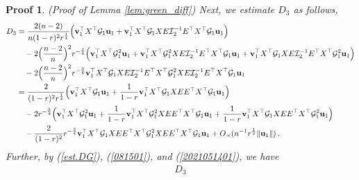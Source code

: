 \documentclass[12pt]{article}
\numberwithin{equation}{section}
\newtheorem{myPro}{Proof}
\theoremstyle{remark}
\newcommand{\1}{{\rm 1}\kern-0.24em{\rm I}}
\begin{document}
\begin{appendices}
\begin{myPro}{(Proof of Lemma \ref{lem:green_diff})}
Next, we estimate $D_3$ as follows,
\begin{align*}
D_3&=\frac{2(n-2)}{n(1-r)^2r^{\frac 14}} \Big( {\bf v}_1^{\top} {X}^{\top} \mathcal{G}_1{\bf u}_1 + {\bf v}_1^{\top} {X}^{\top} \mathcal{G}_1{X}{E} \mathcal{I}_2^{-1}{E}^{\top} {X}^{\top} \mathcal{G}_1 {\bf u}_1\Big) \notag\\
&\quad -2\Big(\frac{n-2}{n}\Big)^2  r^{-\frac 34}\Big( {\bf v}_1^{\top} {X}^{\top} \mathcal{G}_1^2{\bf u}_1 + {\bf v}_1^{\top} {X}^{\top} \mathcal{G}_1^2{X}{E} \mathcal{I}_2^{-1}{E}^{\top} {X}^{\top} \mathcal{G}_1{\bf u}_1 + {\bf v}_1^{\top} {X}^{\top} \mathcal{G}_1{X}{E} \mathcal{I}_2^{-1}{E}^{\top} {X}^{\top} \mathcal{G}_1^2{\bf u}_1\Big) \notag\\
&\quad -  2\Big(\frac{n-2}{n}\Big)^2 r^{-\frac 34} {\bf v}_1^{\top} {X}^{\top} \mathcal{G}_1{X}{E} \mathcal{I}_2^{-1}{E}^{\top} {X}^{\top} \mathcal{G}_1^2 {X}{E} \mathcal{I}_2^{-1}{E}^{\top} {X}^{\top} \mathcal{G}_1{\bf u}_1\notag\\
&= \frac{2}{(1-r)^2r^{\frac 14}} \Big(  {\bf v}_1^{\top} {X}^{\top} \mathcal{G}_1{\bf u}_1+ \frac{1}{1-r}{\bf v}_1^{\top} {X}^{\top} \mathcal{G}_1{X}{E} {E}^{\top} {X}^{\top} \mathcal{G}_1 {\bf u}_1 \Big) \notag\\
 &\quad -  2  r^{-\frac 34}\Big( {\bf v}_1^{\top} {X}^{\top} \mathcal{G}_1^2{\bf u}_1+ \frac{1}{1-r}{\bf v}_1^{\top} {X}^{\top} \mathcal{G}_1^2{X}{E} {E}^{\top} {X}^{\top} \mathcal{G}_1 {\bf u}_1+ \frac{1}{1-r}{\bf v}_1^{\top} {X}^{\top} \mathcal{G}_1{X}{E} {E}^{\top} {X}^{\top} \mathcal{G}_1 ^2{\bf u}_1 \Big) \notag\\
 &\quad - \frac{2}{(1-r)^2}  r^{-\frac 34}{\bf v}_1^{\top} {X}^{\top} \mathcal{G}_1{X}{E}{E}^{\top} {X}^{\top} \mathcal{G}_1^2 {X}{E} {E}^{\top} {X}^{\top} \mathcal{G}_1{\bf u}_1 
 + O_\prec(n^{-1}r^{\frac 12} \Vert {\bf u}_1 \Vert )\,.
 \end{align*}
Further, by   (\ref{est.DG}), (\ref{081501}), and (\ref{2021051401}), we have
 \begin{align}\label{est:D_3}
D_3

\end{align}
\end{myPro}
\end{appendices}
\end{document}
